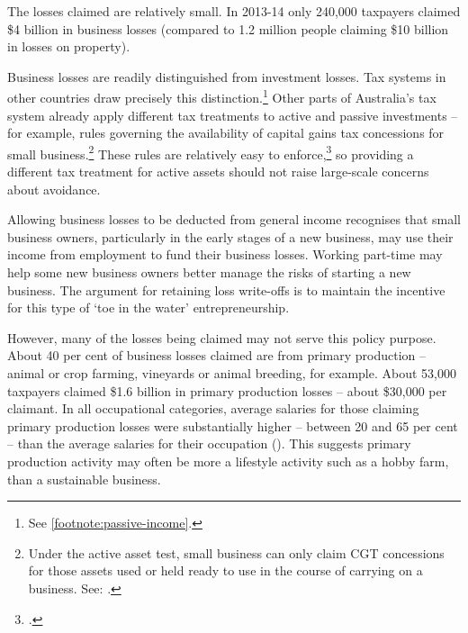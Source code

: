 \documentclass{grattanAlpha}\usepackage[]{graphicx}\usepackage[]{color}
\newcommand{\stopifendnote}[1]{}
\begin{document}
The losses claimed are relatively small. In 2013-14 only 240,000 taxpayers claimed \$4 billion in business losses (compared to 1.2 million people claiming \$10 billion in losses on property).\label{insec:number-taxpayers-claiming-business-losses}

Business losses are readily distinguished from investment losses. Tax systems in other countries draw precisely this distinction.\footnote{See \stopifendnote{}\vref{footnote:passive-income}.} Other parts of Australia’s tax system already apply different tax treatments to active and passive investments – for example, rules governing the availability of capital gains tax concessions for small business.\footnote{Under the active asset test, small business can only claim CGT concessions for those assets used or held ready to use in the course of carrying on a business. See: \textcite{ATO2015ActiveAssetTest}.} These rules are relatively easy to enforce,\footcite{Mather2016} so providing a different tax treatment for active assets should not raise large-scale concerns about avoidance. 

Allowing business losses to be deducted from general income recognises that small business owners, particularly in the early stages of a new business, may use their income from employment to fund their business losses. Working part-time may help some new business owners better manage the risks of starting a new business. The argument for retaining loss write-offs is to maintain the incentive for this type of ‘toe in the water’ entrepreneurship. 

However, many of the losses being claimed may not serve this policy purpose. About 40 per cent of business losses claimed are from primary production – animal or crop farming, vineyards or animal breeding, for example. About 53,000 taxpayers claimed \$1.6 billion in primary production losses – about \$30,000 per claimant. In all occupational categories, average salaries for those claiming primary production losses were substantially higher – between 20 and 65 per cent – than the average salaries for their occupation (). This suggests primary production activity may often be more a lifestyle activity such as a hobby farm, than a sustainable business.
\end{document}
